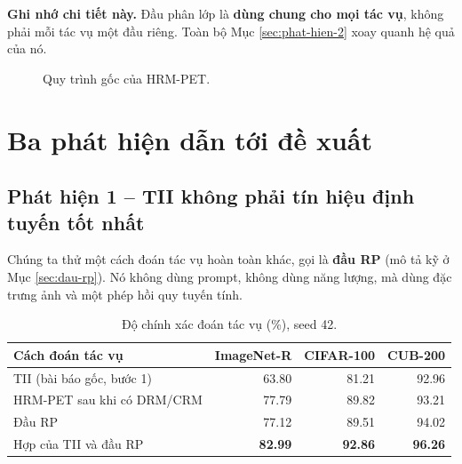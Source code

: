 \documentclass[11pt,a4paper]{article}
\newenvironment{luuy}{\begin{leftbar}\noindent\ignorespaces}{\end{leftbar}}
\begin{document}
\begin{luuy}
\textbf{Ghi nhớ chi tiết này.} Đầu phân lớp là \textbf{dùng chung cho mọi tác
vụ}, không phải mỗi tác vụ một đầu riêng. Toàn bộ Mục \ref{sec:phat-hien-2} xoay
quanh hệ quả của nó.
\end{luuy}

\begin{figure}[htbp]
\centering
{}
\caption{Quy trình gốc của HRM-PET.}
\label{fig:goc}
\end{figure}

\section{Ba phát hiện dẫn tới đề xuất}

\subsection{Phát hiện 1 -- TII không phải tín hiệu định tuyến tốt nhất}

Chúng ta thử một cách đoán tác vụ hoàn toàn khác, gọi là \textbf{đầu RP} (mô tả
kỹ ở Mục \ref{sec:dau-rp}). Nó không dùng prompt, không dùng năng lượng, mà dùng
đặc trưng ảnh và một phép hồi quy tuyến tính.

\begin{table}[htbp]
\centering
\caption{Độ chính xác đoán tác vụ (\%), seed 42.}
\label{tab:routing}
\begin{tabular}{lrrr}
\toprule
Cách đoán tác vụ & ImageNet-R & CIFAR-100 & CUB-200 \\
\midrule
TII (bài báo gốc, bước 1)  & 63.80 & 81.21 & 92.96 \\
HRM-PET sau khi có DRM/CRM & 77.79 & 89.82 & 93.21 \\
Đầu RP                     & 77.12 & 89.51 & 94.02 \\
\midrule
Hợp của TII và đầu RP      & \textbf{82.99} & \textbf{92.86} & \textbf{96.26} \\
\bottomrule
\end{tabular}
\end{table}
\end{document}
